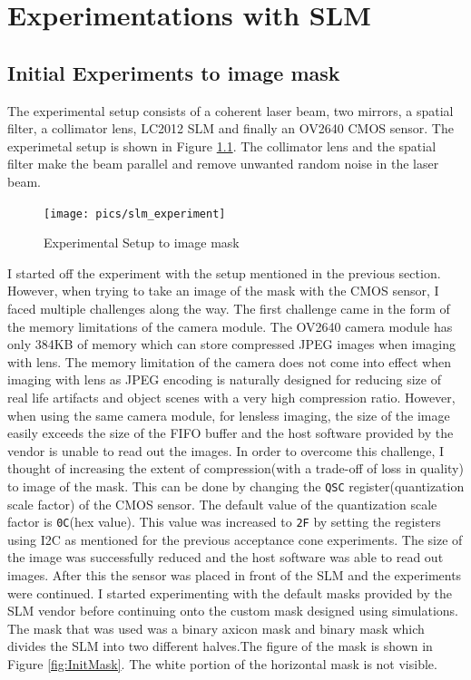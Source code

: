 \chapter{Experimentations with SLM}
\label{chp:SLM}
\section{Initial Experiments to image mask}
The experimental setup consists of a coherent laser beam, two mirrors, a spatial filter, a collimator lens, LC2012 SLM and finally an OV2640 CMOS sensor. The experimetal setup is shown in Figure \ref{fig:experiment_slm}. The collimator lens and the spatial filter make the beam parallel and remove unwanted random noise in the laser beam.


\begin{figure}[htbp]
\centering
\texttt{[image: pics/slm\_experiment]}
\caption{Experimental Setup to image mask}
\label{fig:experiment_slm}
\end{figure}



I started off the experiment with the setup mentioned in the previous section. However, when trying to take an image of the mask with the CMOS sensor, I faced multiple challenges along the  way. The first challenge came in the form of the memory limitations of the camera module. The OV2640 camera module has only 384KB of memory which can store compressed JPEG images when imaging with lens. The memory limitation of the camera does not come into effect when imaging with lens as JPEG encoding is naturally designed for reducing size of real life artifacts and object scenes with a very high compression ratio. However, when using the same camera module, for lensless imaging, the size of the image easily exceeds the size of the FIFO buffer and the host software provided by the vendor is unable to read out the images. In order to overcome this challenge, I thought of increasing the extent of compression(with a trade-off of loss in quality) to image of the mask. This can be done by changing the \texttt{QSC} register(quantization scale factor) \cite{} of the CMOS sensor. The default value of the quantization scale factor is \texttt{0C}(hex value). This value was increased to \texttt{2F} by setting the registers using I2C as mentioned for the previous acceptance cone experiments. The size of the image was successfully reduced and the host software was able to read out images. After this the sensor was placed in front of the SLM and the experiments were continued. I started experimenting with the default masks provided by the SLM vendor before continuing onto the custom mask designed using simulations. The mask that was used was a binary axicon mask and binary mask which divides the SLM into two different halves.The figure of the mask is shown in Figure \ref{fig:InitMask}. The white portion of the horizontal mask is not visible.

